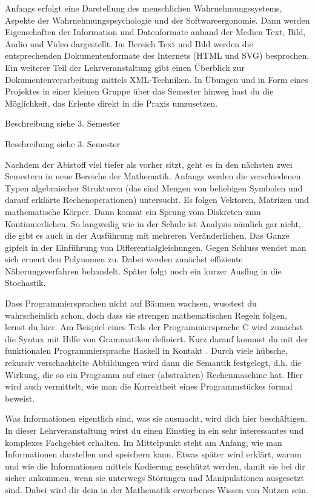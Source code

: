 Anfangs erfolgt eine Darstellung des menschlichen Wahrnehmungssystems, Aspekte der Wahrnehmungspsychologie und der Softwareergonomie.
Dann werden Eigenschaften der Information und Datenformate anhand der Medien Text, Bild, Audio und Video dargestellt.
Im Bereich Text und Bild werden die entsprechenden Dokumentenformate des Internets (HTML und SVG) besprochen.
Ein weiterer Teil der Lehrveranstaltung gibt einen Überblick zur Dokumentenverarbeitung mittels XML-Techniken.
In Übungen und in Form eines Projektes in einer kleinen Gruppe über das Semester hinweg hast du die Möglichkeit, das Erlente direkt in die Praxis umzusetzen.

Beschreibung siehe 3. Semester

Beschreibung siehe 3. Semester


Nachdem der Abistoff viel tiefer als vorher sitzt, geht es in den nächsten zwei Semestern in neue Bereiche der Mathematik.
Anfangs werden die verschiedenen Typen algebraischer Strukturen (das sind Mengen von beliebigen Symbolen und darauf erklärte Rechenoperationen) untersucht.
Es folgen Vektoren, Matrizen und mathematische Körper.
Dann kommt ein Sprung vom Diskreten zum Kontinuierlichen.
So langweilig wie in der Schule ist Analysis nämlich gar nicht, die gibt es auch in der Ausführung mit mehreren Veränderlichen.
Das Ganze gipfelt in der Einführung von Differentialgleichungen.
Gegen Schluss wendet man sich erneut den Polynomen zu.
Dabei werden zunächst effiziente Näherungsverfahren behandelt.
Später folgt noch ein kurzer Ausflug in die Stochastik.

Dass Programmiersprachen nicht auf Bäumen wachsen, wusstest du wahrscheinlich schon, doch dass sie strengen mathematischen Regeln folgen, lernst du hier.
Am Beispiel eines Teils der Programmiersprache C wird zunächst die Syntax mit Hilfe von Grammatiken definiert.
Kurz darauf kommst du mit der funktionalen Programmiersprache Haskell in Kontakt .
Durch viele hübsche, rekursiv verschachtelte Abbildungen wird dann die Semantik festgelegt, d.h. die Wirkung, die so ein Programm auf einer (abstrakten) Rechenmaschine hat.
Hier wird auch vermittelt, wie man die Korrektheit eines Programmstückes formal beweist.

\newpage

Was Informationen eigentlich sind, was sie ausmacht, wird dich hier beschäftigen.
In dieser Lehrveranstaltung wirst du einen Einstieg in ein sehr interessantes und komplexes Fachgebiet erhalten.
Im Mittelpunkt steht am Anfang, wie man Informationen darstellen und speichern kann.
Etwas später wird erklärt, warum und wie die Informationen mittels Kodierung geschützt werden, damit sie bei dir sicher ankommen, wenn sie unterwegs Störungen und Manipulationen ausgesetzt sind.
Dabei wird dir dein in der Mathematik erworbenes Wissen von Nutzen sein.

